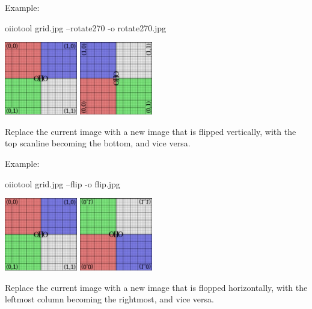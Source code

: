 \noindent Example:
\begin{code}
    oiiotool grid.jpg --rotate270 -o rotate270.jpg
\end{code}
\spc \includegraphics[width=1.25in]{figures/grid-small.jpg}
\raisebox{40pt}{\large $\rightarrow$}
\includegraphics[width=1.25in]{figures/rotate270.jpg} \\
\apiend

Replace the current image with a new image that is flipped vertically,
with the top scanline becoming the bottom, and vice versa.

\noindent Example:
\begin{code}
    oiiotool grid.jpg --flip -o flip.jpg
\end{code}
\spc \includegraphics[width=1.25in]{figures/grid-small.jpg} 
\raisebox{40pt}{\large $\rightarrow$}
\includegraphics[width=1.25in]{figures/flip.jpg} \\
\apiend

Replace the current image with a new image that is flopped horizontally,
with the leftmost column becoming the rightmost, and vice versa.

